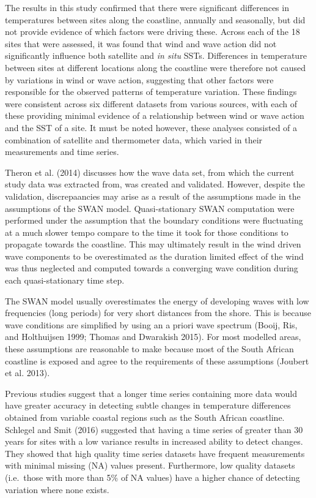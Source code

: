 \documentclass[12pt,A4paper,]{article}
\begin{document}
The results in this study confirmed that there were significant
differences in temperatures between sites along the coastline, annually
and seasonally, but did not provide evidence of which factors were
driving these. Across each of the 18 sites that were assessed, it was
found that wind and wave action did not significantly influence both
satellite and \emph{in situ} SSTs. Differences in temperature between
sites at different locations along the coastline were therefore not
caused by variations in wind or wave action, suggesting that other
factors were responsible for the observed patterns of temperature
variation. These findings were consistent across six different datasets
from various sources, with each of these providing minimal evidence of a
relationship between wind or wave action and the SST of a site. It must
be noted however, these analyses consisted of a combination of satellite
and thermometer data, which varied in their measurements and time
series.

Theron et al. (2014) discusses how the wave data set, from which the
current study data was extracted from, was created and validated.
However, despite the validation, discrepaancies may arise as a result of
the assumptions made in the assumptions of the SWAN model.
Quasi-stationary SWAN computation were performed under the assumption
that the boundary conditions were fluctuating at a much slower tempo
compare to the time it took for those conditions to propagate towards
the coastline. This may ultimately result in the wind driven wave
components to be overestimated as the duration limited effect of the
wind was thus neglected and computed towards a converging wave condition
during each quasi-stationary time step.

The SWAN model usually overestimates the energy of developing waves with
low frequencies (long periods) for very short distances from the shore.
This is because wave conditions are simplified by using an a priori wave
spectrum (Booij, Ris, and Holthuijsen 1999; Thomas and Dwarakish 2015).
For most modelled areas, these assumptions are reasonable to make
because most of the South African coastline is exposed and agree to the
requirements of these assumptions (Joubert et al. 2013).

Previous studies suggest that a longer time series containing more data
would have greater accuracy in detecting subtle changes in temperature
differences obtained from variable coastal regions such as the South
African coastline. Schlegel and Smit (2016) suggested that having a time
series of greater than 30 years for sites with a low variance results in
increased ability to detect changes. They showed that high quality time
series datasets have frequent measurements with minimal missing (NA)
values present. Furthermore, low quality datasets (i.e.~those with more
than 5\% of NA values) have a higher chance of detecting variation where
none exists.
\end{document}
